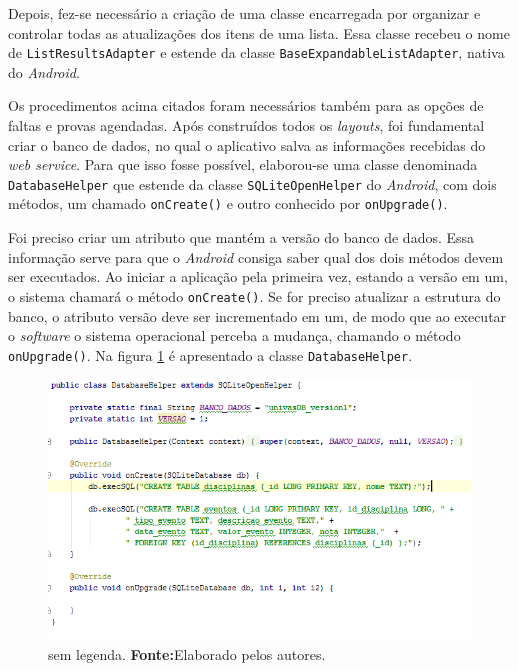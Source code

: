 	\pagebreak
	
	\par Depois, fez-se necessário a criação de uma classe encarregada por
organizar e controlar todas as atualizações dos itens de uma lista. Essa classe
recebeu o nome de \texttt{ListResultsAdapter} e estende da classe
\texttt{BaseExpandableListAdapter}, nativa do \textit{Android}.

	\par Os procedimentos acima citados foram necessários também para as opções de
faltas e provas agendadas. Após construídos todos os \textit{layouts}, foi
fundamental criar o banco de dados, no qual o aplicativo salva as informações
recebidas do \textit{web service}. Para que isso fosse possível, elaborou-se
uma classe denominada \texttt{DatabaseHelper} que estende da classe
\texttt{SQLiteOpenHelper} do \textit{Android}, com dois métodos, um chamado
\texttt{onCreate()} e outro conhecido por \texttt{onUpgrade()}.

	\par Foi preciso criar um atributo que mantém a versão do banco de dados. Essa
informação serve para que o \textit{Android} consiga saber qual dos dois
métodos devem ser executados. Ao iniciar a aplicação pela primeira vez, estando
a versão em um, o sistema chamará o método \texttt{onCreate()}. Se for preciso
atualizar a estrutura do banco, o atributo versão deve ser incrementado em um,
de modo que ao executar o \textit{software} o sistema operacional perceba a
mudança, chamando o método \texttt{onUpgrade()}. Na figura \ref{fig:aplicativo3}
é apresentado a classe \texttt{DatabaseHelper}.	

	\begin{figure}[h!] 
		\centerline{\includegraphics[scale=0.7]{./imagens/2_q_metodologico/4_procedimentos_resultados/42_aplicativo/aplicativo3.png}}
		\caption[sem legenda]{sem legenda. \textbf{Fonte:}Elaborado pelos autores.}
		\label{fig:aplicativo3}
	\end{figure}
	
